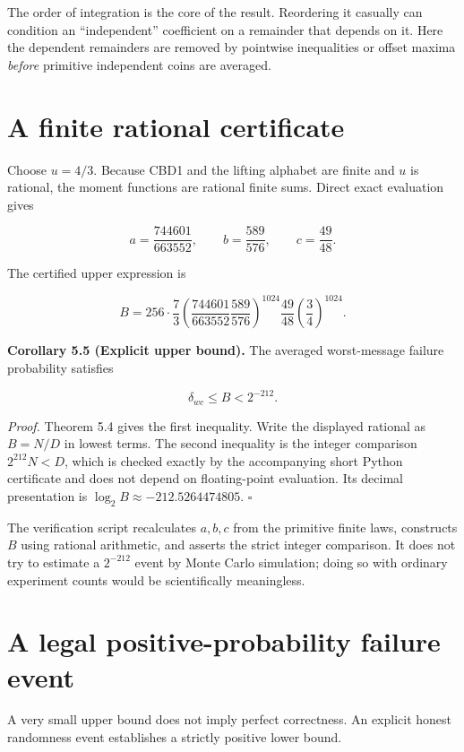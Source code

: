 \documentclass[
  11pt,
  a4paper,
  oneside]{report}
\begin{document}
The order of integration is the core of the result. Reordering it
casually can condition an ``independent'' coefficient on a remainder
that depends on it. Here the dependent remainders are removed by
pointwise inequalities or offset maxima \emph{before} primitive
independent coins are averaged.

\section{A finite rational
certificate}\label{a-finite-rational-certificate}

Choose \(u=4/3\). Because CBD1 and the lifting alphabet are finite and
\(u\) is rational, the moment functions are rational finite sums. Direct
exact evaluation gives

\[
\boxed{\quad
a=\frac{744601}{663552},\qquad
b=\frac{589}{576},\qquad
c=\frac{49}{48}.
\quad}
\]

The certified upper expression is

\[
B=256\cdot\frac73
\left(\frac{744601}{663552}\frac{589}{576}\right)^{1024}
\frac{49}{48}\left(\frac34\right)^{1024}.
\]

\textbf{Corollary 5.5 (Explicit upper bound).} The averaged
worst-message failure probability satisfies

\[
\delta_{wc}\le B<2^{-212}.
\]

\emph{Proof.} Theorem 5.4 gives the first inequality. Write the
displayed rational as \(B=N/D\) in lowest terms. The second inequality
is the integer comparison \(2^{212}N<D\), which is checked exactly by
the accompanying short Python certificate and does not depend on
floating-point evaluation. Its decimal presentation is
\(\log_2 B\approx-212.5264474805\). \(\square\)

The verification script recalculates \(a,b,c\) from the primitive finite
laws, constructs \(B\) using rational arithmetic, and asserts the strict
integer comparison. It does not try to estimate a \(2^{-212}\) event by
Monte Carlo simulation; doing so with ordinary experiment counts would
be scientifically meaningless.

\section{A legal positive-probability failure
event}\label{a-legal-positive-probability-failure-event}

A very small upper bound does not imply perfect correctness. An explicit
honest randomness event establishes a strictly positive lower bound.
\end{document}
